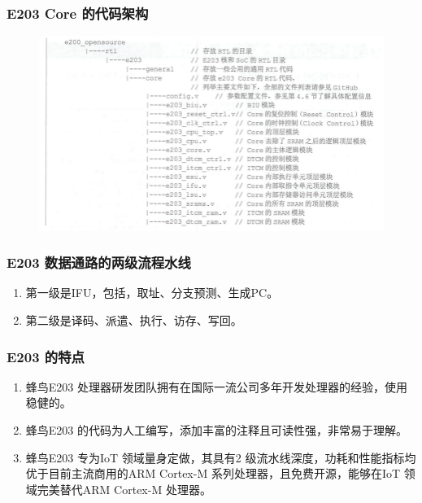 \documentclass[a4paper, 14pt, oneside]{book} %
\numberwithin{equation}{subsection}
\begin{document}
			\subsubsection{E203 Core 的代码架构}
				\begin{figure}[!htbp]
					\centering
					\includegraphics[scale=0.5]{img/framework.png}   
				\end{figure}

			\subsubsection{E203 数据通路的两级流程水线}
				\begin{enumerate}
					\item 
						第一级是IFU，包括，取址、分支预测、生成PC。
					\item 
						第二级是译码、派遣、执行、访存、写回。
				\end{enumerate}	

			\subsubsection{E203 的特点}
				\begin{enumerate}
					\item 
						蜂鸟E203 处理器研发团队拥有在国际一流公司多年开发处理器的经验，使用稳健的。
					\item 
						蜂鸟E203 的代码为人工编写，添加丰富的注释且可读性强，非常易于理解。
					\item 
						蜂鸟E203 专为IoT 领域量身定做，其具有2 级流水线深度，功耗和性能指标均优于目前主流商用的ARM Cortex-M 系列处理器，且免费开源，能够在IoT 领域完美替代ARM Cortex-M 处理器。
				\end{enumerate}	
\end{document}
